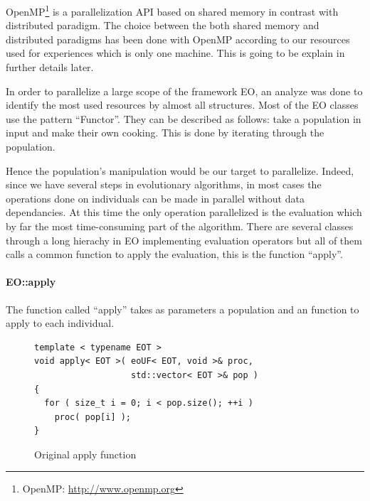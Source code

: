 \documentclass{sig-alternate}
\begin{document}

OpenMP\footnote{OpenMP: \url{http://www.openmp.org}} is a parallelization API based on shared memory in contrast with distributed paradigm. The choice between the both shared memory and distributed paradigms has been done with OpenMP according to our resources used for experiences which is only one machine. This is going to be explain in further details later.

In order to parallelize a large scope of the framework EO, an analyze was done to identify the most used resources by almost all structures. Most of the EO classes use the pattern ``Functor''. They can be described as follows: take a population in input and make their own cooking. This is done by iterating through the population.

Hence the population's manipulation would be our target to parallelize. Indeed, since we have several steps in evolutionary algorithms, in most cases the operations done on individuals can be made in parallel without data dependancies. At this time the only operation parallelized is the evaluation which by far the most time-consuming part of the algorithm. There are several classes through a long hierachy in EO implementing evaluation operators but all of them calls a common function to apply the evaluation, this is the function ``apply''.

\paragraph{EO::apply} %
The function called ``apply'' takes as parameters a population and an function to apply to each individual.


\begin{figure}[here]
\centering
\begin{verbatim}
template < typename EOT >
void apply< EOT >( eoUF< EOT, void >& proc,
                   std::vector< EOT >& pop )
{
  for ( size_t i = 0; i < pop.size(); ++i )
    proc( pop[i] );
}
\end{verbatim}
\caption{Original apply function}
\end{figure}

\end{document}
